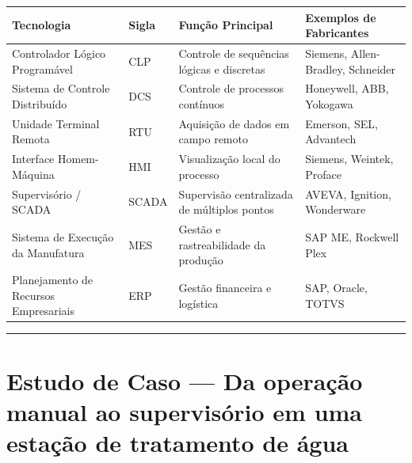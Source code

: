 \begin{longtable}[]{@{}
  >{\raggedright\arraybackslash}p{}
  >{\raggedright\arraybackslash}p{}
  >{\raggedright\arraybackslash}p{}
  >{\raggedright\arraybackslash}p{}@{}}
\toprule\noalign{}
\begin{minipage}[b]{\linewidth}\raggedright
Tecnologia
\end{minipage} & \begin{minipage}[b]{\linewidth}\raggedright
Sigla
\end{minipage} & \begin{minipage}[b]{\linewidth}\raggedright
Função Principal
\end{minipage} & \begin{minipage}[b]{\linewidth}\raggedright
Exemplos de Fabricantes
\end{minipage} \\
\midrule\noalign{}
\endhead
\bottomrule\noalign{}
\endlastfoot
Controlador Lógico Programável & CLP & Controle de sequências lógicas e discretas & Siemens, Allen-Bradley, Schneider \\
Sistema de Controle Distribuído & DCS & Controle de processos contínuos & Honeywell, ABB, Yokogawa \\
Unidade Terminal Remota & RTU & Aquisição de dados em campo remoto & Emerson, SEL, Advantech \\
Interface Homem-Máquina & HMI & Visualização local do processo & Siemens, Weintek, Proface \\
Supervisório / SCADA & SCADA & Supervisão centralizada de múltiplos pontos & AVEVA, Ignition, Wonderware \\
Sistema de Execução da Manufatura & MES & Gestão e rastreabilidade da produção & SAP ME, Rockwell Plex \\
Planejamento de Recursos Empresariais & ERP & Gestão financeira e logística & SAP, Oracle, TOTVS \\
\end{longtable}

\begin{center}\rule{0.5\linewidth}{0.5pt}\end{center}

\section{\texorpdfstring{Estudo de Caso --- Da operação manual ao supervisório em uma estação de tratamento de água}{Estudo de Caso  Da operação manual ao supervisório em uma estação de tratamento de água}}\label{estudo-de-caso-da-operauxe7uxe3o-manual-ao-supervisuxf3rio-em-uma-estauxe7uxe3o-de-tratamento-de-uxe1gua}

